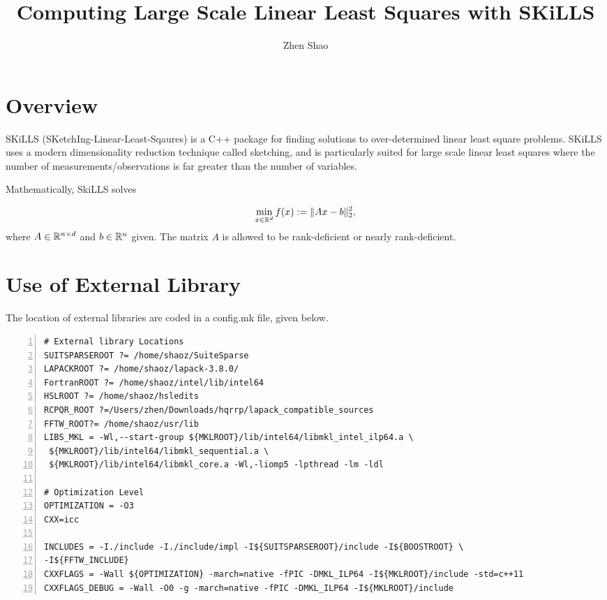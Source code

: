 \documentclass[english,11pt]{article}
\begin{document}
\title{Computing Large Scale Linear Least Squares with SKiLLS}

\author{Zhen Shao}\maketitle

\section{Overview}

SKiLLS (SKetchIng-Linear-Least-Sqaures) is a C++ package for finding solutions to over-determined linear least square problems. SKiLLS uses a modern dimensionality reduction technique called sketching, and is particularly suited for large scale linear least squares where the number of measurements/observations is far greater than the number of variables. 

Mathematically, SkiLLS solves

\begin{align}
\min_{x \in \mathbb{R}^{d}} f(x): = \|Ax - b\|_2^2, \label{eq::problem}
\end{align}
where $A \in \mathbb{R}^{n\times d}$ and $b \in \mathbb{R}^{n}$ given. The matrix $A$ is allowed to be rank-deficient or nearly rank-deficient. 

\section{Use of External Library}

The location of external libraries are coded in a config.mk file, given below. 

\begin{lstlisting}[numbers=left]
# External library Locations
SUITSPARSEROOT ?= /home/shaoz/SuiteSparse
LAPACKROOT ?= /home/shaoz/lapack-3.8.0/
FortranROOT ?= /home/shaoz/intel/lib/intel64
HSLROOT ?= /home/shaoz/hsledits
RCPQR_ROOT ?=/Users/zhen/Downloads/hqrrp/lapack_compatible_sources
FFTW_ROOT?= /home/shaoz/usr/lib
LIBS_MKL = -Wl,--start-group ${MKLROOT}/lib/intel64/libmkl_intel_ilp64.a \
 ${MKLROOT}/lib/intel64/libmkl_sequential.a \
 ${MKLROOT}/lib/intel64/libmkl_core.a -Wl,-liomp5 -lpthread -lm -ldl

# Optimization Level
OPTIMIZATION = -O3
CXX=icc

INCLUDES = -I./include -I./include/impl -I${SUITSPARSEROOT}/include -I${BOOSTROOT} \
-I${FFTW_INCLUDE}
CXXFLAGS = -Wall ${OPTIMIZATION} -march=native -fPIC -DMKL_ILP64 -I${MKLROOT}/include -std=c++11
CXXFLAGS_DEBUG = -Wall -O0 -g -march=native -fPIC -DMKL_ILP64 -I${MKLROOT}/include

\end{lstlisting}
\end{document}
